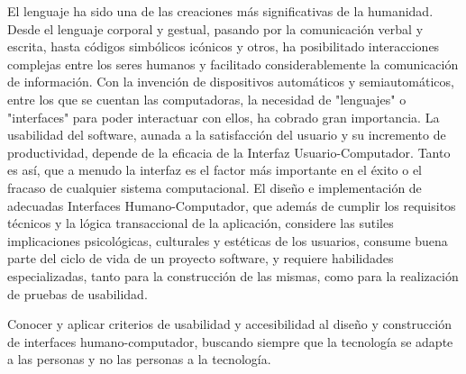 \begin{syllabus}


\begin{justification}
El lenguaje ha sido una de las creaciones más significativas de la humanidad. Desde el lenguaje corporal y gestual, pasando por la comunicación verbal y escrita, hasta códigos simbólicos icónicos y otros, ha posibilitado interacciones complejas entre los seres humanos y facilitado considerablemente la comunicación de información. Con la invención de dispositivos automáticos y semiautomáticos, entre los que se cuentan las computadoras, la necesidad de "lenguajes" o "interfaces" para poder interactuar con ellos, ha cobrado gran importancia.
La usabilidad del software, aunada a la satisfacción del usuario y su incremento de productividad, depende de la eficacia de la Interfaz Usuario-Computador. Tanto es así­, que a menudo la interfaz es el factor más importante en el éxito o el fracaso de cualquier sistema computacional.
El diseño e implementación de adecuadas Interfaces Humano-Computador, que además de cumplir los requisitos técnicos y la lógica transaccional de la aplicación, considere las sutiles implicaciones psicológicas, culturales y estéticas de los usuarios, consume buena parte del ciclo de vida de un proyecto software, y requiere habilidades especializadas, tanto para la construcción de las mismas, como para la realización de pruebas de usabilidad.
\end{justification}

\begin{goals}
\item Conocer y aplicar criterios de usabilidad y accesibilidad al diseño y construcción de interfaces humano-computador, buscando siempre que la tecnología se adapte a las personas y no las personas a la tecnología.
\end{goals}

\begin{outcomes}
\end{outcomes}


\end{syllabus}
